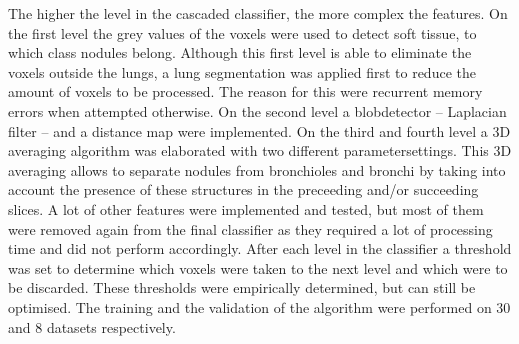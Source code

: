 The higher the level in the cascaded classifier, the more complex the features.
On the first level the grey values of the voxels were used to detect soft
tissue, to which class nodules belong. Although this first level is able to
eliminate the voxels outside the lungs, a lung segmentation was applied first to
reduce the amount of voxels to be processed. The reason for this were recurrent
memory errors when attempted otherwise. On the second level a blobdetector --
Laplacian filter -- and a distance map were implemented. On the third and fourth
level a 3D averaging algorithm was elaborated with two different
parametersettings. This 3D averaging allows to separate nodules from bronchioles
and bronchi by taking into account the presence of these structures in the
preceeding and/or succeeding slices. A lot of other features were implemented
and tested, but most of them were removed again from the final classifier as
they required a lot of processing time and did not perform accordingly. After
each level in the classifier a threshold was set to determine which voxels were
taken to the next level and which were to be discarded. These thresholds were
empirically determined, but can still be optimised. The training and the
validation of the algorithm were performed on 30 and 8 datasets respectively.

